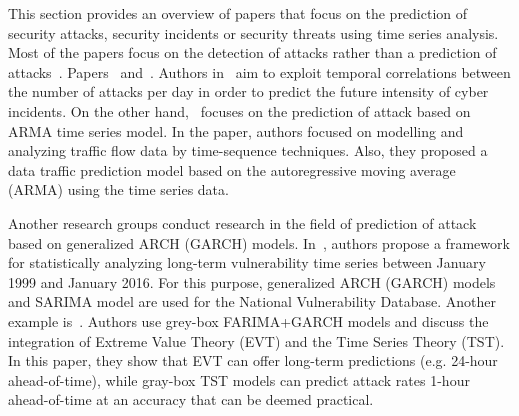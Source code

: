 \documentclass[runningheads]{llncs}
\begin{document}
This section provides an overview of papers that focus on the prediction of security attacks, security incidents or security threats using time series analysis. Most of the papers focus on the detection of attacks rather than a prediction of attacks~\cite{liu2015cloudy}. Papers~\cite{condon2008analysis} and~\cite{werner2017time}. Authors in~\cite{werner2017time}  aim to exploit temporal correlations between the number of attacks per day in order to predict the future intensity of cyber incidents. On the other hand,~\cite{wei2012intrusion} focuses on the prediction of attack based on ARMA time series model. In the paper, authors focused on modelling and analyzing traffic flow data by time-sequence techniques. Also, they proposed a data traffic prediction model based on the autoregressive moving average (ARMA) using the time series data.




Another research groups conduct research in the field of prediction of attack based on generalized ARCH (GARCH) models. In~\cite{tang2016exploiting}, authors propose a framework for statistically analyzing long-term vulnerability time series between January 1999 and January 2016. For this purpose, generalized ARCH (GARCH) models and SARIMA model are used for the National Vulnerability Database. Another example is~\cite{zhan2015predicting}. Authors use grey-box FARIMA+GARCH models and discuss the integration of Extreme Value Theory (EVT) and the Time Series Theory (TST). In this paper, they show that EVT can offer long-term predictions (e.g. 24-hour ahead-of-time), while gray-box TST models can predict attack rates 1-hour ahead-of-time at an accuracy that can be deemed practical.
\end{document}
